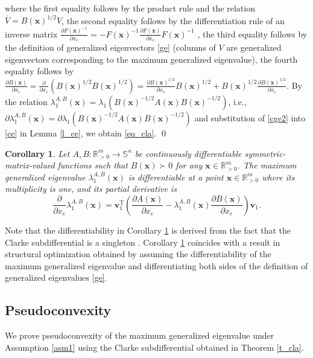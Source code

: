 \documentclass[sn-mathphys,Numbered]{sn-jnl}%
\theoremstyle{thmstyleone}%
\theoremstyle{thmstyletwo}%
\theoremstyle{thmstylethree}%
\newtheorem{corollary}[theorem]{Corollary}
\newcommand{\e}[1]{\begin{equation}#1\end{equation}}
\def\tp{\mathrm{T}}
\def\lamx{\lambda^{A,B}_1(\boldsymbol{x})}
\begin{document}
where the first equality follows by the product rule and the relation $\bar{V}=B(\bm{x})^{1/2}V$, the second equality follows by the differentiation rule of an inverse matrix $\frac{\partial F(\bm{x})^{-1}}{\partial x_e}=-F(\bm{x})^{-1}\frac{\partial F(\bm{x})}{\partial x_e}F(\bm{x})^{-1}$ \cite{harville97}, the third equality follows by the definition of generalized eigenvectors \eqref{ge} (columns of $V$ are generalized eigenvectors corresponding to the maximum generalized eigenvalue), the fourth equality follows by $\frac{\partial B(\bm{x})}{\partial x_e}=\frac{\partial}{\partial x_e}(B(\bm{x})^{1/2}B(\bm{x})^{1/2})=\frac{\partial B(\bm{x})^{1/2}}{\partial x_e}B(\bm{x})^{1/2}+B(\bm{x})^{1/2}\frac{\partial B(\bm{x})^{1/2}}{\partial x_e}$. By the relation $\lamx=\lambda_1(B(\bm{x})^{-1/2}A(\bm{x})B(\bm{x})^{-1/2})$, i.e., $\partial\lamx=\partial\lambda_1(B(\bm{x})^{-1/2}A(\bm{x})B(\bm{x})^{-1/2})$ and substitution of \eqref{cge2} into \eqref{ce} in Lemma \ref{l_ce}, we obtain \eqref{eq_cla}.
\qed

\begin{corollary}
Let $A,B:\mathbb{R}^m_{>0}\to\mathbb{S}^n$ be continuously differentiable symmetric-matrix-valued functions such that $B(\bm{x})\succ 0$ for any $\bm{x}\in\mathbb{R}^m_{>0}$. The maximum generalized eigenvalue $\lamx$ is differentiable at a point $\bm{x}\in\mathbb{R}^m_{>0}$ where its multiplicity is one, and its partial derivative is
\e{
\frac{\partial}{\partial x_e}\lamx = \bm{v}_1^\tp\left(\frac{\partial A(\bm{x})}{\partial x_e}-\lamx \frac{\partial B(\bm{x})}{\partial x_e}\right)\bm{v}_1.
}
\label{c_grad}
\end{corollary}

Note that the differentiability in Corollary \ref{c_grad} is derived from the fact that the Clarke subdifferential is a singleton \cite{clarke90}. Corollary \ref{c_grad} coincides with a result in structural optimization \cite{seyranian94} obtained by assuming the differentiability of the maximum generalized eigenvalue and differentiating both sides of the definition of generalized eigenvalues \eqref{ge}.

\subsection{Pseudoconvexity}

We prove pseudoconvexity of the maximum generalized eigenvalue under Assumption \ref{asm1} using the Clarke subdifferential obtained in Theorem \ref{t_cla}.
\end{document}
